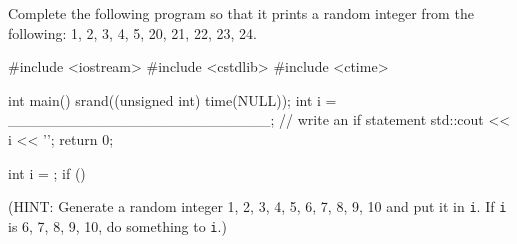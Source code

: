 \nextq
Complete the following program so that it prints a random integer from
the following: 1, 2, 3, 4, 5, 20, 21, 22, 23, 24.
\begin{console}[commandchars=\~\!\@,fontsize=\footnotesize]
#include <iostream>
#include <cstdlib>
#include <ctime>

int main()
{
    srand((unsigned int) time(NULL));
    int i = _________________________;
    // write an if statement
    std::cout << i << '\n';
    return 0;
}
\end{console}
\ANSWER
\begin{answercode}
int i =       ;
if ()
{
}
\end{answercode}
(HINT: Generate a random integer 1, 2, 3, 4, 5, 6, 7, 8, 9, 10 and put it in
\verb!i!. If \verb!i! is 6, 7, 8, 9, 10, do something to \verb!i!.)


